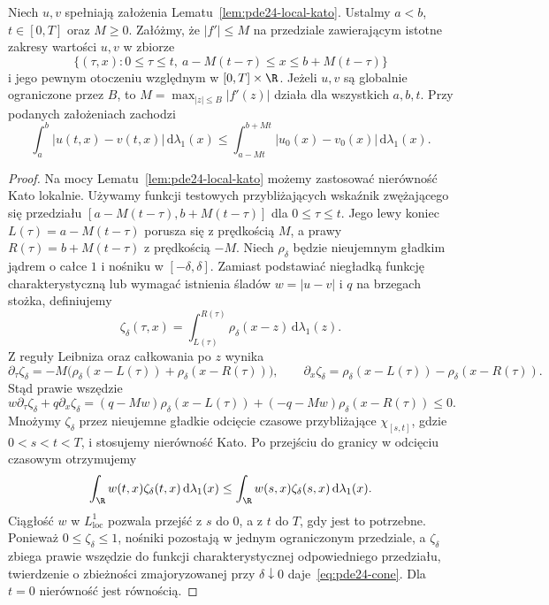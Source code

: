 \begin{wniosek}
\label{cor:pde24-finite}
Niech $u,v$ spełniają założenia
Lematu~\ref{lem:pde24-local-kato}. Ustalmy $a<b$,
$t\in[0,T]$ oraz $M\ge0$. Załóżmy, że $|f'|\le M$
na przedziale zawierającym istotne zakresy wartości
$u,v$ w zbiorze
\[
 \{(\tau,x):0\le\tau\le t,\ 
 a-M(t-\tau)\le x\le b+M(t-\tau)\}
\]
i jego pewnym otoczeniu względnym w $[0,T]\times\R$.
Jeżeli $u,v$ są globalnie ograniczone przez $B$,
to $M=\max_{|z|\le B}|f'(z)|$ działa dla wszystkich
$a,b,t$. Przy podanych założeniach zachodzi
\begin{equation}\label{eq:pde24-cone}
 \int_a^b|u(t,x)-v(t,x)|\,\mathrm d\lambda_1(x)
 \le\int_{a-Mt}^{b+Mt}|u_0(x)-v_0(x)|\,\mathrm d\lambda_1(x).
\end{equation}
\end{wniosek}
\begin{proof}
Na mocy Lematu~\ref{lem:pde24-local-kato}
możemy zastosować nierówność Kato lokalnie. Używamy
funkcji testowych przybliżających wskaźnik zwężającego się przedziału
$[a-M(t-\tau),b+M(t-\tau)]$ dla $0\le\tau\le t$.
Jego lewy koniec $L(\tau)=a-M(t-\tau)$ porusza się
z prędkością $M$, a prawy $R(\tau)=b+M(t-\tau)$
z prędkością $-M$. Niech $\rho_\delta$ będzie nieujemnym gładkim jądrem
o całce $1$ i nośniku w $[-\delta,\delta]$. Zamiast
podstawiać niegładką funkcję charakterystyczną lub
wymagać istnienia śladów $w=|u-v|$ i $q$ na brzegach
stożka, definiujemy
\[
 \zeta_\delta(\tau,x)=
 \int_{L(\tau)}^{R(\tau)}\rho_\delta(x-z)\,
 \mathrm d\lambda_1(z).
\]
Z reguły Leibniza oraz całkowania po $z$ wynika
\[
 \partial_\tau\zeta_\delta
 =-M\bigl(\rho_\delta(x-L(\tau))+
             \rho_\delta(x-R(\tau))\bigr),
 \qquad
 \partial_x\zeta_\delta
 =\rho_\delta(x-L(\tau))-\rho_\delta(x-R(\tau)).
\]
Stąd prawie wszędzie
\[
 w\partial_\tau\zeta_\delta+q\partial_x\zeta_\delta
 =(q-Mw)\rho_\delta(x-L(\tau))
   +(-q-Mw)\rho_\delta(x-R(\tau))\le0.
\]
Mnożymy $\zeta_\delta$ przez nieujemne gładkie
odcięcie czasowe przybliżające $\chi_{[s,t]}$,
gdzie $0<s<t<T$, i stosujemy nierówność Kato.
Po przejściu do granicy w odcięciu czasowym otrzymujemy
\[
 \int_\R w(t,x)\zeta_\delta(t,x)\,\mathrm d\lambda_1(x)
 \le
 \int_\R w(s,x)\zeta_\delta(s,x)\,\mathrm d\lambda_1(x).
\]
Ciągłość $w$ w $L^1_{\mathrm{loc}}$ pozwala
przejść z $s$ do $0$, a z $t$ do $T$, gdy jest to
potrzebne. Ponieważ $0\le\zeta_\delta\le1$,
nośniki pozostają w jednym ograniczonym przedziale,
a $\zeta_\delta$ zbiega prawie wszędzie do funkcji
charakterystycznej odpowiedniego przedziału,
twierdzenie o zbieżności zmajoryzowanej przy
$\delta\downarrow0$ daje~\eqref{eq:pde24-cone}.
Dla $t=0$ nierówność jest równością.
\end{proof}


